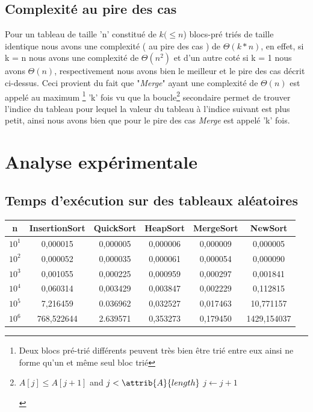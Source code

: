 \documentclass[a4paper, 11pt, oneside]{article}
\begin{document}
\subsection{Complexité au pire des cas}
Pour un tableau de taille 'n' constitué de $k(\leq n$) blocs-pré triés de taille identique nous avons une complexité ( au pire des cas ) de $\Theta(k*n)$, en effet, si k = n nous avons une complexité de $\Theta(n^{2})$ et d'un autre coté si k = 1 nous avons $\Theta(n)$, respectivement nous avons bien le meilleur et le pire des cas décrit ci-dessus. Ceci provient du fait que "\textit{Merge}" ayant une complexité de $\Theta(n)$ est appelé au maximum \footnote{Deux blocs pré-trié différents peuvent très bien être trié entre eux ainsi ne forme qu'un et même seul bloc trié} 'k' fois vu que la boucle\footnote{\begin{codebox}
\li \While $A[j] \leq A[j+1]$ and $j < \attrib{A}{length}$
\li \Do
$j \gets j + 1$
\End
\end{codebox} }
secondaire permet de trouver l'indice du tableau pour lequel la valeur du tableau à l'indice suivant est plus petit, ainsi nous avons bien que pour le pire des cas \textit{Merge} est appelé 'k' fois.

\newpage

\section{Analyse expérimentale}
\subsection{Temps d'exécution sur des tableaux aléatoires}

\begin{table}[htb]
\begin{tabular}{cccccc}
\hline

n   & InsertionSort & QuickSort & HeapSort & MergeSort & NewSort \\ \hline
$10^{1}$ & 0,000015      & 0,000005  & 0,000006         & 0,000009          & 0,000005        \\
$10^{2}$ & 0,000052      & 0,000035  & 0,000061         & 0,000054          & 0,000090        \\
$10^{3}$ & 0,001055      & 0,000225  & 0,000959         & 0,000297          & 0,001841        \\
$10^{4}$ & 0,060314      & 0,003429  & 0,003847         & 0,002229          & 0,112815        \\
$10^{5}$ & 7,216459      & 0.036962  & 0,032527         & 0,017463           & 10,771157        \\
$10^{6}$ & 768,522644    & 2.639571  & 0,353273         & 0,179450          & 1429,154037
        
\end{tabular}
\end{table}
\end{document}
